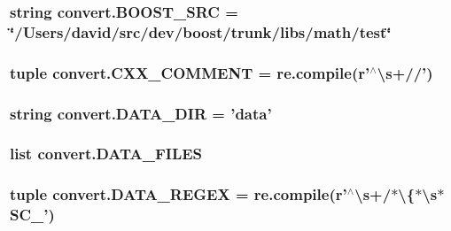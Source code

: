\subsubsection[{B\+O\+O\+S\+T\+\_\+\+S\+R\+C}]{\setlength{\rightskip}{0pt plus 5cm}string convert.\+B\+O\+O\+S\+T\+\_\+\+S\+R\+C = \char`\"{}/Users/david/src/dev/boost/trunk/libs/math/test\char`\"{}}\label{namespaceconvert_a74027563264b979c98d0913f5b6e4df7}
\hypertarget{namespaceconvert_a874bcd91a82f541d257048a6b471cd42}{}
\subsubsection[{C\+X\+X\+\_\+\+C\+O\+M\+M\+E\+N\+T}]{\setlength{\rightskip}{0pt plus 5cm}tuple convert.\+C\+X\+X\+\_\+\+C\+O\+M\+M\+E\+N\+T = re.\+compile({\bf r}'$^\wedge$\textbackslash{}{\bf s}+//')}\label{namespaceconvert_a874bcd91a82f541d257048a6b471cd42}
\hypertarget{namespaceconvert_a8fbcbafaf218ed4308c911ad18deb377}{}
\subsubsection[{D\+A\+T\+A\+\_\+\+D\+I\+R}]{\setlength{\rightskip}{0pt plus 5cm}string convert.\+D\+A\+T\+A\+\_\+\+D\+I\+R = 'data'}\label{namespaceconvert_a8fbcbafaf218ed4308c911ad18deb377}
\hypertarget{namespaceconvert_aa34566905942b5b020a4ed8fdfe88663}{}
\subsubsection[{D\+A\+T\+A\+\_\+\+F\+I\+L\+E\+S}]{\setlength{\rightskip}{0pt plus 5cm}list convert.\+D\+A\+T\+A\+\_\+\+F\+I\+L\+E\+S}\label{namespaceconvert_aa34566905942b5b020a4ed8fdfe88663}
\hypertarget{namespaceconvert_a8aaa34723091aba26dfa8133793e99f7}{}
\subsubsection[{D\+A\+T\+A\+\_\+\+R\+E\+G\+E\+X}]{\setlength{\rightskip}{0pt plus 5cm}tuple convert.\+D\+A\+T\+A\+\_\+\+R\+E\+G\+E\+X = re.\+compile({\bf r}'$^\wedge$\textbackslash{}{\bf s}+/$\ast$\textbackslash{}\{$\ast$\textbackslash{}{\bf s}$\ast$S\+C\+\_\+')}\label{namespaceconvert_a8aaa34723091aba26dfa8133793e99f7}
\hypertarget{namespaceconvert_a348778f5084675a813a98d6539c871d1}{}
